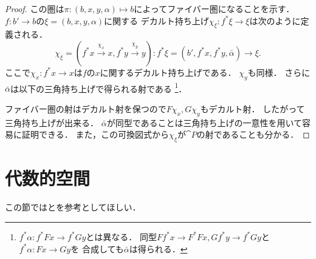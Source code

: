 \begin{proof}
        この圏は$\pi \colon (b,x,y,\alpha) \mapsto b$によってファイバー圏になることを示す．
        $f \colon b' \to b$の$\xi=(b, x, y, \alpha)$に関する
        デカルト持ち上げ$\chi_{\xi} \colon f^*\xi \to \xi$は次のように定義される．
        \[
            \chi_{\xi}=(f^*x \xrightarrow{\chi_x} x, f^*y \xrightarrow{\chi_y} y)
            \colon
            f^*\xi=(b', f^*x, f^*y, \bar{\alpha}) \to \xi.
        \]
        ここで$\chi_x \colon f^*x \to x$は$f$の$x$に関するデカルト持ち上げである．
        $\chi_y$も同様．
        さらに$\bar{\alpha}$は以下の三角持ち上げで得られる射である
        \footnote
        {
            $f^*\alpha \colon f^*Fx \to f^*Gy$とは異なる．
            同型$Ff^*x \to F^*Fx, Gf^*y \to f^*Gy$と$f^*\alpha \colon Fx \to Gy$を
            合成しても$\bar{\alpha}$は得られる．
        }．
        \begin{center}
        \end{center}
        ファイバー圏の射はデカルト射を保つので$F\chi_x, G\chi_y$もデカルト射．
        したがって三角持ち上げが出来る．
        $\bar{\alpha}$が同型であることは三角持ち上げの一意性を用いて容易に証明できる．
        また，この可換図式から$\chi_{\xi}$が$\cat{P}$の射であることも分かる．
    \end{proof}

\section{代数的空間}
    この節では\cite{Olsson16}と\cite{SP}を参考としてほしい．

